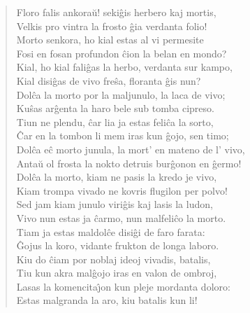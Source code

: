 \begin{verse}
            \vin   Floro falis ankora\u u! seki\^gis herbero kaj mortis,\\
            Velkis pro vintra la frosto \^gia verdanta folio!\\
            Morto senkora, ho kial estas al vi permesite\\
            Fosi en fosan profundon \^cion la belan en mondo?\\
            Kial, ho kial fali\^gas la herbo, verdanta sur kampo,\\
            Kial disi\^gas de vivo fre\^sa, floranta \^gis nun?\\
            Dol\^ca la morto por la maljunulo, la laca de vivo;\\
            Ku\^sas ar\^genta la haro bele sub tomba cipreso.\\
            Tiun ne plendu, \^car lia ja estas feli\^ca la sorto,\\
            \^Car en la tombon li mem iras kun \^gojo, sen timo;\\
            Dol\^ca e\^c morto junula, la mort' en mateno de l' vivo,\\
            Anta\u u ol frosta la nokto detruis bur\^gonon en \^germo!\\
            Dol\^ca la morto, kiam ne pasis la kredo je vivo,\\
            Kiam trompa vivado ne kovris flugilon per polvo!\\
            Sed jam kiam junulo viri\^gis kaj lasis la ludon,\\
            Vivo nun estas ja \^carmo, nun malfeli\^co la morto.\\
            Tiam ja estas maldol\^ce disi\^gi de faro farata:\\
            \^Gojus la koro, vidante frukton de longa laboro.\\
            Kiu do \^ciam por noblaj ideoj vivadis, batalis,\\
            Tiu kun akra mal\^gojo iras en valon de ombroj,\\
            Lasas la komencita\^{\j}on kun pleje mordanta doloro:\\
            Estas malgranda la aro, kiu batalis kun li!


\end{verse}
